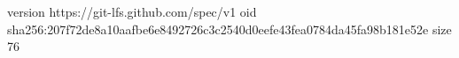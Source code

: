 version https://git-lfs.github.com/spec/v1
oid sha256:207f72de8a10aafbe6e8492726c3c2540d0eefe43fea0784da45fa98b181e52e
size 76
